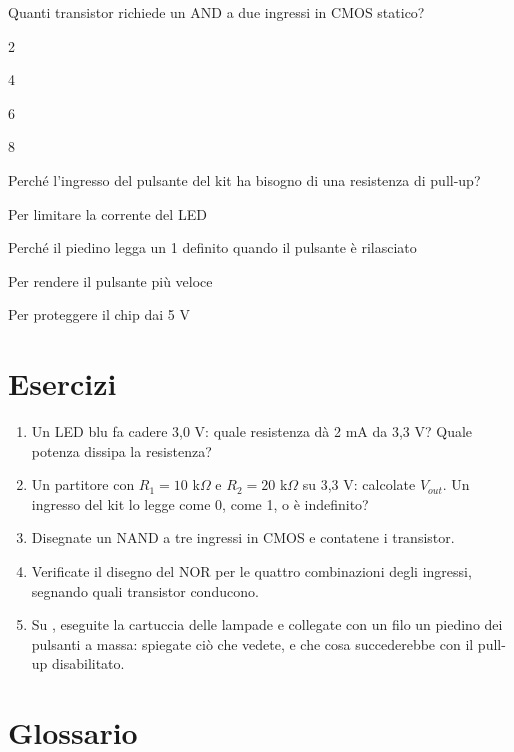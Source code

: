 \begin{quiz}{Quanti transistor richiede un AND a due ingressi in CMOS statico?}
\item 2
\item 4
\item 6
\item 8
\end{quiz}

\begin{quiz}{Perché l'ingresso del pulsante del kit ha bisogno di una resistenza di pull-up?}
\item Per limitare la corrente del LED
\item Perché il piedino legga un 1 definito quando il pulsante è rilasciato
\item Per rendere il pulsante più veloce
\item Per proteggere il chip dai 5 V
\end{quiz}

\section{Esercizi}

\begin{exercise}
\begin{enumerate}[nosep]
\item Un LED blu fa cadere 3,0 V: quale resistenza dà 2 mA da 3,3 V? Quale
  potenza dissipa la resistenza?
\item Un partitore con $R_1=10$ k$\Omega$ e $R_2=20$ k$\Omega$ su 3,3 V:
  calcolate $V_{out}$. Un ingresso del kit lo legge come 0, come 1, o è
  indefinito?
\item Disegnate un NAND a tre ingressi in CMOS e contatene i transistor.
\item Verificate il disegno del NOR per le quattro combinazioni degli ingressi,
  segnando quali transistor conducono.
\item Su \prg, eseguite la cartuccia delle lampade e collegate con un filo un
  piedino dei pulsanti a massa: spiegate ciò che vedete, e che cosa
  succederebbe con il pull-up disabilitato.
\end{enumerate}
\end{exercise}

\section{Glossario}

